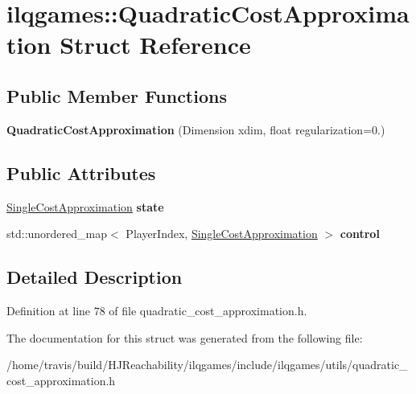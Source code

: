 \hypertarget{structilqgames_1_1_quadratic_cost_approximation}{}\section{ilqgames\+:\+:Quadratic\+Cost\+Approximation Struct Reference}
\label{structilqgames_1_1_quadratic_cost_approximation}
\subsection*{Public Member Functions}
\begin{DoxyCompactItemize}
\item 
{\bfseries Quadratic\+Cost\+Approximation} (Dimension xdim, float regularization=0.)\hypertarget{structilqgames_1_1_quadratic_cost_approximation_a0722ad542477052b0a489ead01165e16}{}\label{structilqgames_1_1_quadratic_cost_approximation_a0722ad542477052b0a489ead01165e16}

\end{DoxyCompactItemize}
\subsection*{Public Attributes}
\begin{DoxyCompactItemize}
\item 
\hyperlink{structilqgames_1_1_single_cost_approximation}{Single\+Cost\+Approximation} {\bfseries state}\hypertarget{structilqgames_1_1_quadratic_cost_approximation_a9a1ba94f8eb8f4c7bf22233feab63b15}{}\label{structilqgames_1_1_quadratic_cost_approximation_a9a1ba94f8eb8f4c7bf22233feab63b15}

\item 
std\+::unordered\+\_\+map$<$ Player\+Index, \hyperlink{structilqgames_1_1_single_cost_approximation}{Single\+Cost\+Approximation} $>$ {\bfseries control}\hypertarget{structilqgames_1_1_quadratic_cost_approximation_aa39cc7796517e7333e43675ddf162881}{}\label{structilqgames_1_1_quadratic_cost_approximation_aa39cc7796517e7333e43675ddf162881}

\end{DoxyCompactItemize}


\subsection{Detailed Description}


Definition at line 78 of file quadratic\+\_\+cost\+\_\+approximation.\+h.



The documentation for this struct was generated from the following file\+:\begin{DoxyCompactItemize}
\item 
/home/travis/build/\+H\+J\+Reachability/ilqgames/include/ilqgames/utils/quadratic\+\_\+cost\+\_\+approximation.\+h\end{DoxyCompactItemize}
